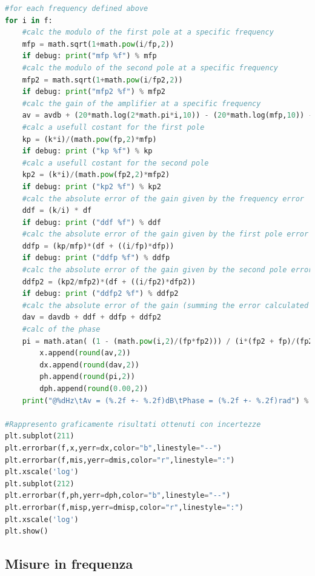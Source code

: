 \documentclass{article}
\begin{document}
\begin{lstlisting}[language=Python, breaklines=true]
#for each frequency defined above
for i in f:
	#calc the modulo of the first pole at a specific frequency
	mfp = math.sqrt(1+math.pow(i/fp,2))
	if debug: print("mfp %f") % mfp
	#calc the modulo of the second pole at a specific frequency
	mfp2 = math.sqrt(1+math.pow(i/fp2,2))
	if debug: print("mfp2 %f") % mfp2
	#calc the gain of the amplifier at a specific frequency
	av = avdb + (20*math.log(2*math.pi*i,10)) - (20*math.log(mfp,10)) - (20*math.log(mfp2,10))
	#calc a usefull costant for the first pole
	kp = (k*i)/(math.pow(fp,2)*mfp)
	if debug: print ("kp %f") % kp
	#calc a usefull costant for the second pole
	kp2 = (k*i)/(math.pow(fp2,2)*mfp2)
	if debug: print ("kp2 %f") % kp2
	#calc the absolute error of the gain given by the frequency error
	ddf = (k/i) * df
	if debug: print ("ddf %f") % ddf
	#calc the absolute error of the gain given by the first pole error
	ddfp = (kp/mfp)*(df + ((i/fp)*dfp))
	if debug: print ("ddfp %f") % ddfp
	#calc the absolute error of the gain given by the second pole error
	ddfp2 = (kp2/mfp2)*(df + ((i/fp2)*dfp2))
	if debug: print ("ddfp2 %f") % ddfp2
	#calc the absolute error of the gain (summing the error calculated before)
	dav = davdb + ddf + ddfp + ddfp2
	#calc of the phase
	pi = math.atan( (1 - (math.pow(i,2)/(fp*fp2))) / (i*(fp2 + fp)/(fp2*fp)))
        x.append(round(av,2))
        dx.append(round(dav,2))
        ph.append(round(pi,2))
        dph.append(round(0.00,2))
	print("@%dHz\tAv = (%.2f +- %.2f)dB\tPhase = (%.2f +- %.2f)rad") % (i, x[len(x)-1], dx[len(x)-1],ph[len(ph)-1],dph[-1])

#Rappresento graficamente risultati ottenuti con incertezze
plt.subplot(211)
plt.errorbar(f,x,yerr=dx,color="b",linestyle="--")
plt.errorbar(f,mis,yerr=dmis,color="r",linestyle=":")
plt.xscale('log')
plt.subplot(212)
plt.errorbar(f,ph,yerr=dph,color="b",linestyle="--")
plt.errorbar(f,misp,yerr=dmisp,color="r",linestyle=":")
plt.xscale('log')
plt.show()
\end{lstlisting}

\subsection{Misure in frequenza}
\end{document}
